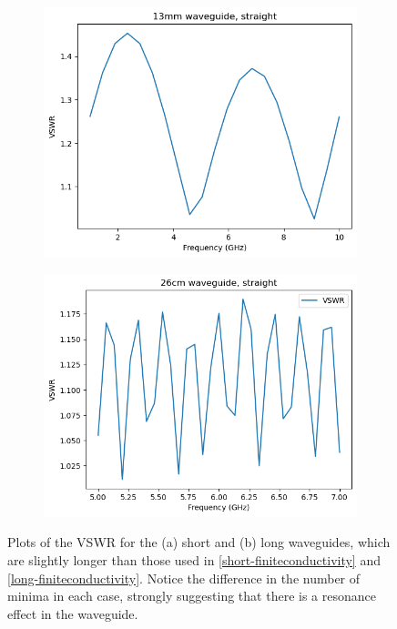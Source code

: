 \begin{figure}
	\centering
	\begin{subfigure}{0.4\textwidth}
		\includegraphics[scale=0.5]{images/plots/short-finitecond-longbox.png}
		\caption{}
		\label{short-finitecond-longbox}
	\end{subfigure}
	\hspace{2cm}
	\begin{subfigure}{0.4\textwidth}
		\includegraphics[scale=0.5]{images/plots/long-finitecond-longbox.png}
		\caption{}
		\label{long-finitecond-longbox}
	\end{subfigure}
	\caption{Plots of the VSWR for the (a) short and (b) long waveguides, which are slightly longer than
		those used in \cref{short-finiteconductivity} and \cref{long-finiteconductivity}. Notice the
		difference in the number of minima in each case, strongly suggesting that there is a resonance effect in
	the waveguide.}
	\label{longbox-waveguides}
\end{figure}

